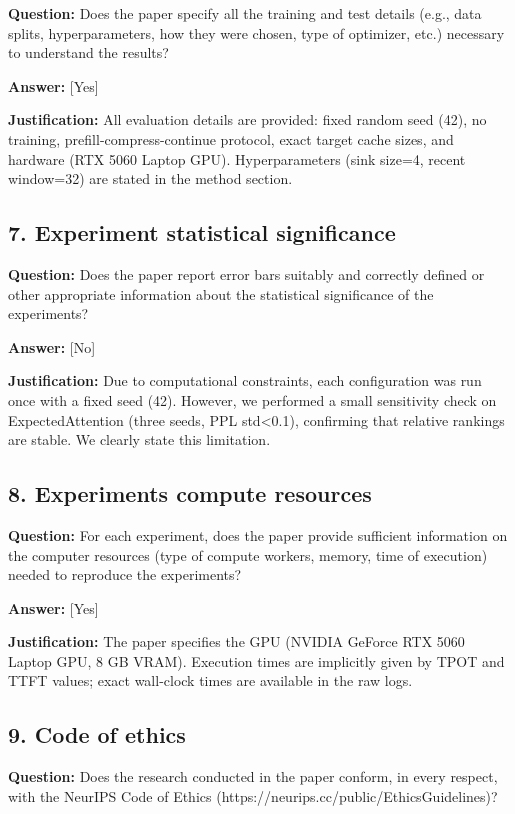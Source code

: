 \documentclass{article}
\begin{document}
\textbf{Question:} Does the paper specify all the training and test details (e.g., data splits, hyperparameters, how they were chosen, type of optimizer, etc.) necessary to understand the results?

\textbf{Answer:} [Yes]

\textbf{Justification:} All evaluation details are provided: fixed random seed (42), no training, prefill-compress-continue protocol, exact target cache sizes, and hardware (RTX 5060 Laptop GPU). Hyperparameters (sink size=4, recent window=32) are stated in the method section.

\subsection*{7. Experiment statistical significance}

\textbf{Question:} Does the paper report error bars suitably and correctly defined or other appropriate information about the statistical significance of the experiments?

\textbf{Answer:} [No]

\textbf{Justification:} Due to computational constraints, each configuration was run once with a fixed seed (42). However, we performed a small sensitivity check on ExpectedAttention (three seeds, PPL std<0.1), confirming that relative rankings are stable. We clearly state this limitation.

\subsection*{8. Experiments compute resources}

\textbf{Question:} For each experiment, does the paper provide sufficient information on the computer resources (type of compute workers, memory, time of execution) needed to reproduce the experiments?

\textbf{Answer:} [Yes]

\textbf{Justification:} The paper specifies the GPU (NVIDIA GeForce RTX 5060 Laptop GPU, 8 GB VRAM). Execution times are implicitly given by TPOT and TTFT values; exact wall-clock times are available in the raw logs.

\subsection*{9. Code of ethics}

\textbf{Question:} Does the research conducted in the paper conform, in every respect, with the NeurIPS Code of Ethics (https://neurips.cc/public/EthicsGuidelines)?
\end{document}
